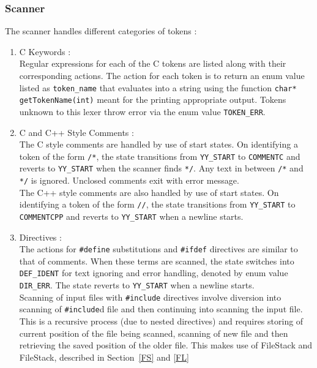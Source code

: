 \documentclass[12pt]{article}
\begin{document}
\subsubsection{Scanner}
The scanner handles different categories of tokens :
\begin{enumerate}
\item C Keywords :
\\Regular expressions for each of the C tokens are listed along with their corresponding actions. The action for each token is to return an enum value listed as \texttt{token\_name} that evaluates into a string using the function \texttt{char* getTokenName(int)} meant for the printing appropriate output. Tokens unknown to this lexer throw error via the enum value \texttt{TOKEN\_ERR}.

\item C and C++ Style Comments :
\\The C style comments are handled by use of start states. On identifying a token of the form \texttt{/*}, the state transitions from \texttt{YY\_START} to \texttt{COMMENTC} and reverts to \texttt{YY\_START} when the scanner finds \texttt{*/}. Any text in between \texttt{/*} and \texttt{*/} is ignored. Unclosed comments exit with error message.
\\The C++ style comments are also handled by use of start states. On identifying a token of the form \texttt{//}, the state transitions from \texttt{YY\_START} to \texttt{COMMENTCPP} and reverts to \texttt{YY\_START} when a newline starts.

\item Directives :
\\ The actions for \texttt{\#define} substitutions and \texttt{\#ifdef} directives are similar to that of comments. When these terms are scanned, the state switches into \texttt{DEF\_IDENT} for text ignoring and error handling, denoted by enum value \texttt{DIR\_ERR}. The state reverts to \texttt{YY\_START} when a newline starts.
\\Scanning of input files with \texttt{\#include} directives involve diversion into scanning of \texttt{\#include}d file and then continuing into scanning the input file. This is a recursive process (due to nested directives) and requires storing of current position of the file being scanned, scanning of new file and then retrieving the saved position of the older file. This makes use of FileStack and FileStack, described in Section~\ref{FS} and \ref{FL}  
\end{enumerate}
\end{document}
